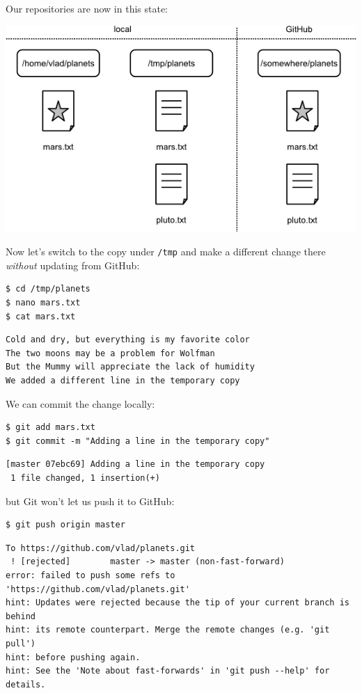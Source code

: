 \documentclass{book}
\begin{document}
Our repositories are now in this state:

\includegraphics{novice/git/img/git-after-first-conflicting-change.png}

Now let's switch to the copy under \texttt{/tmp} and make a different
change there \emph{without} updating from GitHub:

\begin{verbatim}
$ cd /tmp/planets
$ nano mars.txt
$ cat mars.txt
\end{verbatim}

\begin{verbatim}
Cold and dry, but everything is my favorite color
The two moons may be a problem for Wolfman
But the Mummy will appreciate the lack of humidity
We added a different line in the temporary copy
\end{verbatim}

We can commit the change locally:

\begin{verbatim}
$ git add mars.txt
$ git commit -m "Adding a line in the temporary copy"
\end{verbatim}

\begin{verbatim}
[master 07ebc69] Adding a line in the temporary copy
 1 file changed, 1 insertion(+)
\end{verbatim}

but Git won't let us push it to GitHub:

\begin{verbatim}
$ git push origin master
\end{verbatim}

\begin{verbatim}
To https://github.com/vlad/planets.git
 ! [rejected]        master -> master (non-fast-forward)
error: failed to push some refs to 'https://github.com/vlad/planets.git'
hint: Updates were rejected because the tip of your current branch is behind
hint: its remote counterpart. Merge the remote changes (e.g. 'git pull')
hint: before pushing again.
hint: See the 'Note about fast-forwards' in 'git push --help' for details.
\end{verbatim}
\end{document}
